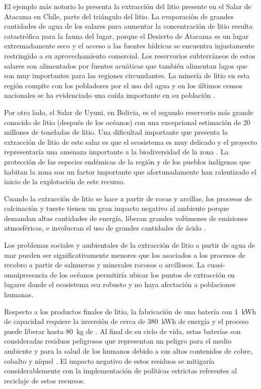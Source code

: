 El ejemplo más notorio lo presenta la extracción del litio presente en el Salar de Atacama en Chile, parte del triángulo del litio. La evaporación de grandes cantidades de agua de los salares para aumentar la concentración de litio resulta catastrófica para la fauna del lugar, porque el Desierto de Atacama es un lugar extremadamente seco y el acceso a las fuentes hídricas se encuentra injustamente restringido a su aprovechamiento comercial. Los reservorios subterráneos de estos salares son alimentados por fuentes acuáticas que también alimentan lagos que son muy importantes para las regiones circundantes. La minería de litio en esta región compite con los pobladores por el uso del agua y en los últimos  censos nacionales se ha evidenciado una caída importante en su población \citep{Romero2012, LIU202012}.

Por otro lado, el Salar de Uyuni, en Bolivia, es el segundo reservorio más grande conocido de litio (después de los océanos) con una excepcional estimación de 20 millones de toneladas de litio. Una dificultad importante que presenta la extracción de litio de este salar es que el ecosistema es muy delicado y el proyecto representaría una amenaza importante a la biodiversidad de la zona \citep{Hancock2018}. La protección de las especies endémicas de la región y de los pueblos indígenas que habitan la zona son un factor importante que afortunadamente han ralentizado el inicio de la explotación de este recurso.

Cuando la extracción de litio se hace a partir de rocas y arcillas, los procesos de calcinación y tueste tienen un gran impacto negativo al ambiente porque demandan altas cantidades de energía, liberan grandes volúmenes de emisiones atmosféricas, e involucran el uso de grandes cantidades de ácido \citep{Hancock2018}.

Los problemas sociales y ambientales de la extracción de litio a partir de agua de mar pueden ser significativamente menores que los asociados a los procesos de recobro a partir de salmueras y minerales rocosos o arcillosos. La cuasi-omnipresencia de los océanos permitiría ubicar los puntos de extracción en lugares donde el ecosistema sea robusto y no haya afectación a poblaciones humanas.

Respecto a los productos finales de litio, la fabricación de una batería con 1~kWh de capacidad requiere la inversión de cerca de 380~kWh de energía y el proceso puede liberar hasta 80~kg de  \citep{Chagnes2015}. Al final de su ciclo de vida, estas baterías son consideradas residuos peligrosos que representan un peligro para el medio ambiente y para la salud de los humanos debido a sus altos contenidos de cobre, cobalto y níquel \citep{Kang2013}. El impacto negativo de estos residuos se mitigaría considerablemente con la implementación de políticas estrictas referentes al reciclaje de estos recursos.
